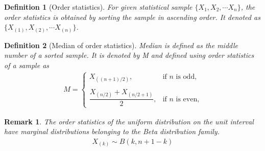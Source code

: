 \documentclass[journal,12pt,twocolumn]{IEEEtran}
\newtheorem{definition}{Definition}[section]
\newtheorem{remark}[theorem]{Remark}
\begin{document}
\begin{definition}[Order statistics]
For given statistical sample $\{X_1, X_2,\cdots X_n\}$, the order statistics is obtained by sorting the sample in ascending order. It denoted as $\{X_{(1)}, X_{(2)},\cdots X_{(n)}\}$.
\end{definition}


\begin{definition}[Median of order statistics]
Median is defined as the middle number of a sorted sample. It is denoted by M and defined using order statistics of a sample as
\begin{align}
  M =
  \begin{cases}
   X_{((n+1)/2)},                                           &\text{if $n$ is odd,} \\ \\
  \dfrac{ X_{(n/2)} + X_{(n/2+1)}}{2} ,                     &\text{if $n$ is even,} 
  \end{cases}
\end{align}
\label{median}\label{def2}
\end{definition}


\begin{remark}
The order statistics of the uniform distribution on the unit interval have marginal distributions belonging to the Beta distribution family.
\begin{align}
X_{(k)} \sim B(k,n+1-k)
\end{align}\label{rem}
\end{remark}
\end{document}
